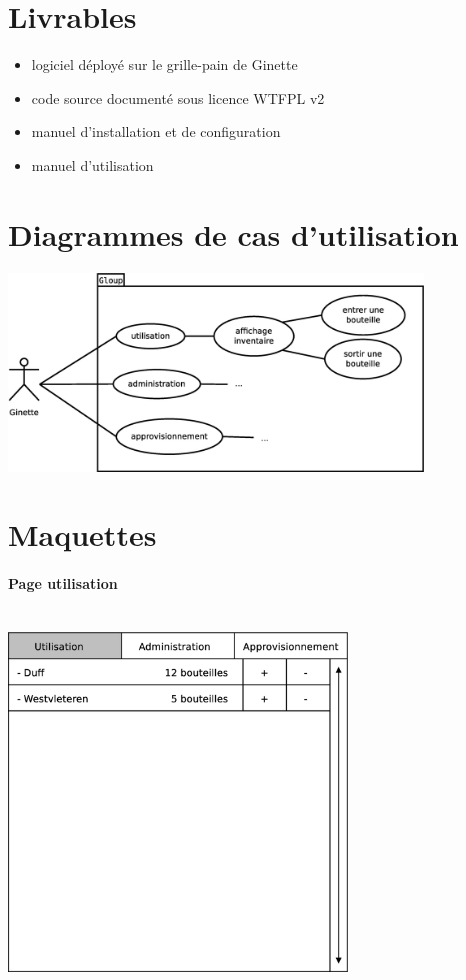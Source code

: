 \documentclass[a4paper,oneside]{article}
\begin{document}

\newpage

\appendix

\section{Livrables}

\begin{itemize}
    \item logiciel déployé sur le grille-pain de Ginette
    \item code source documenté sous licence WTFPL v2 
    \item manuel d'installation et de configuration
    \item manuel d'utilisation
\end{itemize}

\section{Diagrammes de cas d'utilisation}

\includegraphics[width=11cm]{cdc_use_case.eps}




\section{Maquettes}

\paragraph{Page utilisation}

~\\

\includegraphics[width=9cm]{cdc_maquette1.eps}
\end{document}
